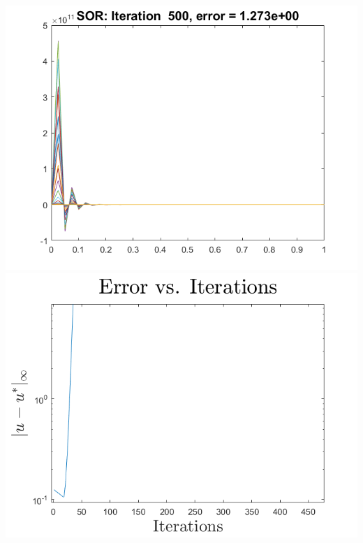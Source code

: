 \documentclass{article}
\begin{document}
\begin{center}
    \includegraphics[scale = 0.4]{notworking.png}
    \includegraphics[scale = 0.4]{notworkingerror.png}
\end{center}
\end{document}
